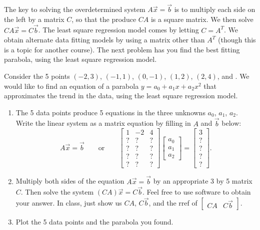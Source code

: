 The key to solving the overdetermined system $A\vec x=\vec b$ is to multiply each side on the left by a matrix $C$, so that the produce $CA$ is a square matrix. We then solve $CA\vec x = C\vec b$. The least square regression model comes by letting $C=A^T$.  We obtain alternate data fitting models by using a matrix other than $A^T$ (though this is a topic for another course).  The next problem has you find the best fitting parabola, using the least square regression model.
\begin{problem}
 Consider the 5 points $(-2,3)$, $(-1,1)$, $(0,-1)$, $(1,2)$, $(2,4)$, and . We would like to find an equation of a parabola $y = a_0 +a_1 x+ a_2x^2$ that approximates the trend in the data, using the least square regression model.  
\begin{enumerate}
 \item The 5 data points produce 5 equations in the three unknowns $a_0$, $a_1$, $a_2$. Write the linear system as a matrix equation by filling in $A$ and $\vec b$ below:
 $$A\vec x=\vec b\quad\quad\text{or}\quad \quad\begin{bmatrix}1&-2&4\\ ? &?&? \\ ?&?&?\\ ?&?&?\\ ?&?&? \end{bmatrix}\begin{bmatrix}a_0\\a_1\\a_2\end{bmatrix}=\begin{bmatrix}3\\ ? \\ ? \\ ? \\ ? \end{bmatrix}.$$
 \item Multiply both sides of the equation $A\vec x = \vec b$ by an appropriate 3 by 5 matrix $C$. Then solve the system $(C A)\vec x = C \vec b$. Feel free to use software to obtain your answer.  In class, just show us $CA$, $C\vec b$, and the rref of $\begin{bmatrix}CA&C\vec b\end{bmatrix}$.
 \item Plot the 5 data points and the parabola you found.
\end{enumerate}

\end{problem}




